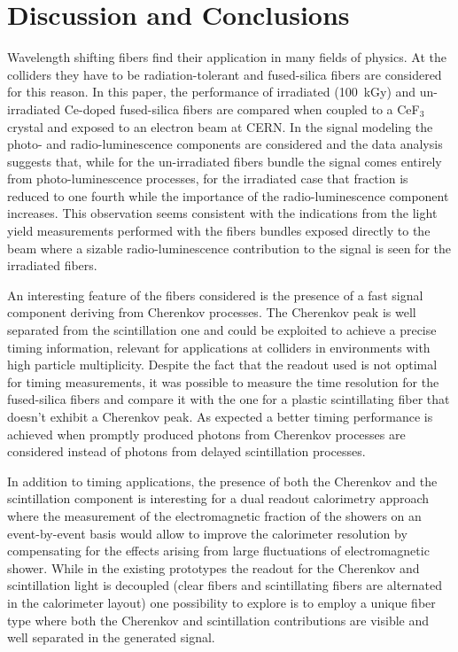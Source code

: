 \documentclass[a4paper,11pt]{article}
\begin{document}
\section{Discussion and Conclusions}
\label{sec:conclusions}
Wavelength shifting fibers find their application in many fields of physics. At the colliders they have to be radiation-tolerant and fused-silica fibers are considered for this reason. In this paper, the performance of irradiated (100~kGy) and un-irradiated Ce-doped fused-silica fibers are compared when coupled to a CeF$_3$ crystal and exposed to an electron beam at CERN. In the signal modeling the photo- and radio-luminescence components are considered and the data analysis suggests that, while for the un-irradiated fibers bundle the signal comes entirely from photo-luminescence processes, for the irradiated case that fraction is reduced to one fourth while the importance of the radio-luminescence component increases. This observation seems consistent with the indications from the light yield measurements performed with the fibers bundles exposed directly to the beam where a sizable radio-luminescence contribution to the signal is seen for the irradiated fibers.

An interesting feature of the fibers considered is the presence of a fast signal component deriving from Cherenkov processes. The Cherenkov peak is well separated from the scintillation one and could be exploited to achieve a precise timing information, relevant for applications at colliders in environments with high particle multiplicity. Despite the fact that the readout used is not optimal for timing measurements, it was possible to measure the time resolution for the fused-silica fibers and compare it with the one for a plastic scintillating fiber that doesn't exhibit a Cherenkov peak. As expected a better timing performance is achieved when promptly produced photons from Cherenkov processes are considered instead of photons from delayed scintillation processes.

In addition to timing applications, the presence of both the Cherenkov and the scintillation component is interesting for a dual readout calorimetry approach where the measurement of the electromagnetic fraction of the showers on an event-by-event basis would allow to improve the calorimeter resolution by compensating for the effects arising from large fluctuations of electromagnetic shower. While in the existing prototypes the readout for the Cherenkov and scintillation light is decoupled (clear fibers and scintillating fibers are alternated in the calorimeter layout) one possibility to explore is to employ a unique fiber type where both the Cherenkov and scintillation contributions are visible and well separated in the generated signal.
\end{document}
